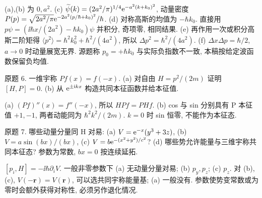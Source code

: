 \begin{solution}
(a),(b) 为 $0,a^2$. (c) $\widetilde\psi(k)=(2a^2/\pi)^{1/4}\mathrm e^{-a^2(k+k_0)^2}$, 动量密度 $P(p)=\sqrt{2a^2/\pi}\mathrm e^{-2a^2(p/\hbar+k_0)^2}/\hbar$. (d) 对称高斯的均值为 $-\hbar k_0$. 直接用 $p\psi=(\ii\hbar x/(2a^2)-\hbar k_0)\psi$ 并积分, 奇项零, 相同结果. (e) 再作用一次或积分高斯二阶矩得 $\langle p^2\rangle=\hbar^2k_0^2+\hbar^2/(4a^2)$, 所以 $\Delta p^2=\hbar^2/(4a^2)$. (f) $\Delta x\Delta p=\hbar/2$, $a\to0$ 时动量展宽无界. 源题称 $p_0=+\hbar k_0$ 与实际负指数不一致, 本稿按给定波函数保留负均值.
\end{solution}
\begin{exercise}\label{ex:2202-2-6}
原题 6. 一维宇称 $Pf(x)=f(-x)$. (a) 对自由 $H=p^2/(2m)$ 证明 $[H,P]=0$. (b) 从 $\mathrm e^{\pm\mathrm i kx}$ 构造共同本征函数并给本征值.
\end{exercise}
\begin{solution}
(a) $(Pf)''(x)=f''(-x)$, 所以 $HPf=PHf$. (b) cos 与 sin 分别具有 P 本征值 $+1,-1$, 两者动能同为 $\hbar^2k^2/(2m)$. $k=0$ 时 sin 恒零, 不能作为本征态.
\end{solution}
\begin{exercise}\label{ex:2202-2-7}
原题 7. 哪些动量分量同 H 对易: (a) $V=\mathrm e^{-x}(y^3+3z)$, (b) $V=a\sin(bx)/(bx)$, (c) $V=b\mathrm e^{-(x^2+y^2)/c^2}$? (d) 哪些势允许能量与三维宇称共同本征态? 参数为常数, $bx=0$ 按连续延拓.
\end{exercise}
\begin{solution}
$[p_i,H]=-\ii\hbar\partial_iV$. 一般非零参数下 (a) 无动量分量对易; (b) $p_y,p_z$; (c) $p_z$. 对 (b),(c), $V(-\mathbf r)=V(\mathbf r)$, 可以选共同宇称能量基; (a) 一般没有. 参数使势变常数或为零时会额外获得对称性, 必须另作退化情况.
\end{solution}
